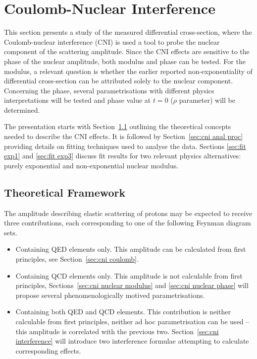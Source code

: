 \section{Coulomb-Nuclear Interference}
\label{sec:coulomb}

This section presents a study of the measured differential cross-section, where the Coulomb-nuclear interference (CNI) is used a tool to probe the nuclear component of the scattering amplitude. Since the CNI effects are sensitive to the phase of the nuclear amplitude, both modulus and phase can be tested. For the modulus, a relevant question is whether the earlier reported non-exponentiality of differential cross-section \cite{8tev-90m} can be attributed solely to the nuclear component. Concerning the phase, several parametrisations with different physics interpretations will be tested and phase value at $t = 0$ ($\rho$ parameter) will be determined.

The presentation starts with Section~\ref{sec:cni framework} outlining the theoretical concepts needed to describe the CNI effects. It is followed by Section~\ref{sec:cni anal proc} providing details on fitting techniques used to analyse the data. Sections \ref{sec:fit exp1} and \ref{sec:fit exp3} discuss fit results for two relevant physics alternatives: purely exponential and non-exponential nuclear modulus.




\subsection{Theoretical Framework}
\label{sec:cni framework}

The amplitude describing elastic scattering of protons may be expected to receive three contributions, each corresponding to one of the following Feynman diagram sets.
\begin{itemize}
\item Containing QED elements only. This amplitude can be calculated from first principles, see Section~\ref{sec:cni coulomb}.
\item Containing QCD elements only. This amplitude is not calculable from first principles, Sections~\ref{sec:cni nuclear modulus} and \ref{sec:cni nuclear phase} will propose several phenomenologically motived parametrisations.
\item Containing both QED and QCD elements. This contribution is neither calculable from first principles, neither ad hoc parametrisation can be used -- this amplitude is correlated with the previous two. Section~\ref{sec:cni interference} will introduce two interference formulae attempting to calculate corresponding effects.
\end{itemize}


